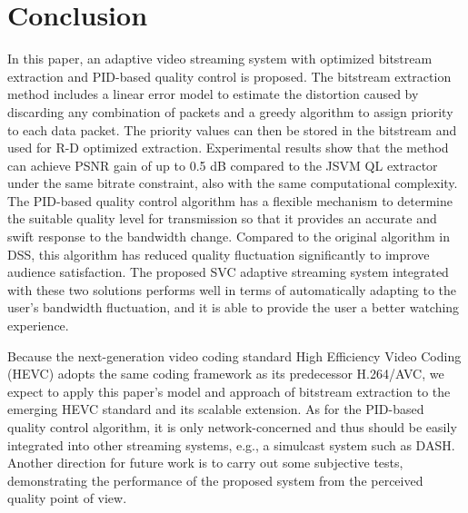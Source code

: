 \documentclass[journal]{IEEEtran}
\begin{document}
\section{Conclusion}
\label{sec:conclusion}

In this paper, an adaptive video streaming system with optimized bitstream extraction and PID-based quality control is proposed. The bitstream extraction method includes a linear error model to estimate the distortion caused by discarding any combination of packets and a greedy algorithm to assign priority to each data packet. The priority values can then be stored in the bitstream and used for R-D optimized extraction. Experimental results show that the method can achieve PSNR gain of up to 0.5 dB compared to the JSVM QL extractor under the same bitrate constraint, also with the same computational complexity. The PID-based quality control algorithm has a flexible mechanism to determine the suitable quality level for transmission so that it provides an accurate and swift response to the bandwidth change. Compared to the original algorithm in DSS, this algorithm has reduced quality fluctuation significantly to improve audience satisfaction. The proposed SVC adaptive streaming system integrated with these two solutions performs well in terms of automatically adapting to the user's bandwidth fluctuation, and it is able to provide the user a better watching experience.

Because the next-generation video coding standard High Efficiency Video Coding (HEVC) \cite{HEVC} adopts the same coding framework as its predecessor H.264/AVC, we expect to apply this paper's model and approach of bitstream extraction to the emerging HEVC standard and its scalable extension. As for the PID-based quality control algorithm, it is only network-concerned and thus should be easily integrated into other streaming systems, e.g., a simulcast system such as DASH. Another direction for future work is to carry out some subjective tests, demonstrating the performance of the proposed system from the perceived quality point of view.

\ifCLASSOPTIONcaptionsoff
  \newpage
\fi



\end{document}
